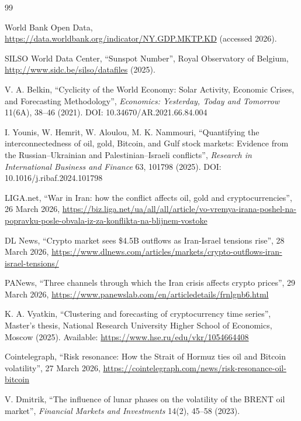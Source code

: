 \documentclass[11pt,a4paper]{article}
\theoremstyle{remark}
\begin{document}
	\begin{thebibliography}{99}
		
		World Bank Open Data, \url{https://data.worldbank.org/indicator/NY.GDP.MKTP.KD} (accessed 2026).
		
		SILSO World Data Center, ``Sunspot Number'', Royal Observatory of Belgium, \url{http://www.sidc.be/silso/datafiles} (2025).
		
		V. A. Belkin, ``Cyclicity of the World Economy: Solar Activity, Economic Crises, and Forecasting Methodology'', \emph{Economics: Yesterday, Today and Tomorrow} 11(6A), 38–46 (2021). DOI: 10.34670/AR.2021.66.84.004
		
		I. Younis, W. Hemrit, W. Aloulou, M. K. Nammouri, ``Quantifying the interconnectedness of oil, gold, Bitcoin, and Gulf stock markets: Evidence from the Russian–Ukrainian and Palestinian–Israeli conflicts'', \emph{Research in International Business and Finance} 63, 101798 (2025). DOI: 10.1016/j.ribaf.2024.101798
		
		LIGA.net, ``War in Iran: how the conflict affects oil, gold and cryptocurrencies'', 26 March 2026, \url{https://biz.liga.net/ua/all/all/article/vo-vremya-irana-poshel-na-popravku-posle-obvala-iz-za-konflikta-na-blijnem-vostoke}
		
		DL News, ``Crypto market sees \$4.5B outflows as Iran-Israel tensions rise'', 28 March 2026, \url{https://www.dlnews.com/articles/markets/crypto-outflows-iran-israel-tensions/}
		
		PANews, ``Three channels through which the Iran crisis affects crypto prices'', 29 March 2026, \url{https://www.panewslab.com/en/articledetails/frnlgnb6.html}
		
		K. A. Vyatkin, ``Clustering and forecasting of cryptocurrency time series'', Master's thesis, National Research University Higher School of Economics, Moscow (2025). Available: \url{https://www.hse.ru/edu/vkr/1054664408}
		
		Cointelegraph, ``Risk resonance: How the Strait of Hormuz ties oil and Bitcoin volatility'', 27 March 2026, \url{https://cointelegraph.com/news/risk-resonance-oil-bitcoin}
		
		V. Dmitrik, ``The influence of lunar phases on the volatility of the BRENT oil market'', \emph{Financial Markets and Investments} 14(2), 45–58 (2023).
		

\end{thebibliography}
\end{document}
